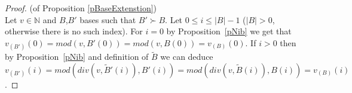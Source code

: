 \documentclass[envcountsame]{llncs}
\begin{document}
\begin{proof}(of Proposition \ref{pBaseExtenstion})\\
Let $v\in \mathbb{N}$ and $B$,$B'$ bases such that $B'\succ B$.
Let $0 \leq i \leq |B|-1$ ($|B|>0$, otherwise there is no such index).
For $i=0$ by Proposition~\ref{pNib} we get that
 $v_{(B')}(0)=mod(v,B'(0))=mod(v,B(0))=v_{(B)}(0)$.
If $i>0$ then by Proposition~\ref{pNib} and definition of $\tilde B$ we can deduce $v_{(B')}(i)=mod(div(v,\tilde B'(i)),B'(i)) =
mod(div(v,\tilde B(i)),B(i))=v_{(B)}(i) $.
\end{proof}
\end{document}
